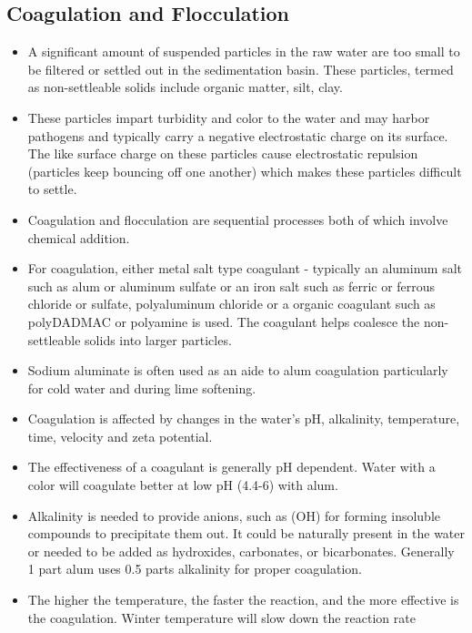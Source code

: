 \begin{itemize}
\begin{itemize}
\end{itemize}

\subsection{Coagulation and Flocculation}
\begin{itemize}
\item A significant amount of suspended particles in the raw water are too small to be filtered or settled out in the sedimentation basin.  These particles, termed as non-settleable solids include organic matter, silt, clay.
\item These particles impart turbidity and color to the water and may harbor pathogens and typically carry a negative electrostatic charge on its surface.  The like surface charge on these particles cause electrostatic repulsion (particles keep bouncing off one another) which makes these particles difficult to settle. 
\item Coagulation and flocculation are sequential processes both of which involve chemical addition.
\item For coagulation, either metal salt type coagulant - typically an aluminum salt such as alum or aluminum sulfate or an iron salt such as ferric or ferrous chloride or sulfate, polyaluminum chloride or a organic coagulant such as polyDADMAC or polyamine is used. The coagulant helps coalesce the non-settleable solids into larger particles.
\item Sodium aluminate is often used as an aide to alum coagulation particularly for cold water and during lime softening.
\item Coagulation is affected by changes in the water's pH, alkalinity, temperature, time, velocity and zeta potential.

\item The effectiveness of a coagulant is generally pH dependent. Water with a color will coagulate better at low pH (4.4-6) with alum.

\item Alkalinity is needed to provide anions, such as (OH) for forming insoluble compounds to precipitate them out. It could be naturally present in the water or needed to be added as hydroxides, carbonates, or bicarbonates.  Generally 1 part alum uses 0.5 parts alkalinity for proper coagulation.

\item The higher the temperature, the faster the reaction, and the more effective is the coagulation. Winter temperature will slow down the reaction rate


\end{itemize}
\end{itemize}
